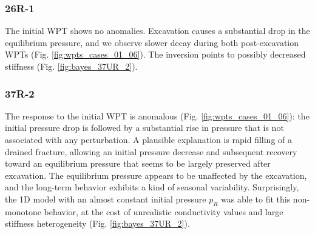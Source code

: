 \subsubsection{26R-1}
The initial WPT shows no anomalies. Excavation causes a substantial drop in the equilibrium pressure, and we observe slower decay during both
post-excavation WPTs (Fig. \ref{fig:wpts_cases_01_06}). The inversion points to possibly decreased stiffness
(Fig. \ref{fig:bayes_37UR_2}).

\subsubsection{37R-2}
The response to the initial WPT is anomalous (Fig. \ref{fig:wpts_cases_01_06}): the initial pressure drop is followed by a substantial rise in pressure
that is not associated with any perturbation. A plausible explanation is rapid filling of a drained fracture, allowing an initial pressure decrease and subsequent
recovery toward an equilibrium pressure that seems to be largely preserved after excavation. The equilibrium pressure appears to be unaffected by the excavation,
and the long-term behavior exhibits a kind of seasonal variability. Surprisingly, the 1D model with an almost constant initial pressure $p_R$ was able to fit this
non-monotone behavior, at the cost of unrealistic conductivity values and large stiffness heterogeneity (Fig. \ref{fig:bayes_37UR_2}).


